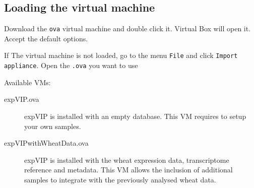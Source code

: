 \subsection{Loading the virtual
machine}\label{loading-the-virtual-machine}

Download the \lstinline!ova! virtual machine and double click it.
Virtual Box will open it. Accept the default options.

If The virtual machine is not loaded, go to the menu \lstinline!File!
and click \lstinline!Import appliance!. Open the \lstinline!.ova! you
want to use

Available VMs: 
\begin{description}
\item[expVIP.ova] expVIP is installed with an empty
database. This VM requires to setup your own samples. 

\item[expVIPwithWheatData.ova] expVIP is installed with the wheat
expression data, transcriptome reference and metadata. This VM allows
the inclusion of additional samples to integrate with the previously
analysed wheat data.
\end{description}

